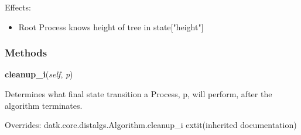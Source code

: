 Effects:

\begin{itemize}
\setlength{\parskip}{0.6ex}
  \item Root Process knows height of tree in state["height"]

\end{itemize}



  \subsubsection{Methods}

    \vspace{0.5ex}

\hspace{.8\funcindent}\begin{boxedminipage}{\funcwidth}

    \raggedright \textbf{cleanup\_i}(\textit{self}, \textit{p})

\setlength{\parskip}{2ex}
    Determines what final state transition a Process, p, will perform, 
    after the algorithm terminates.

\setlength{\parskip}{1ex}
      Overrides: datk.core.distalgs.Algorithm.cleanup\_i 	extit{(inherited documentation)}

    \end{boxedminipage}

    \vspace{0.5ex}

